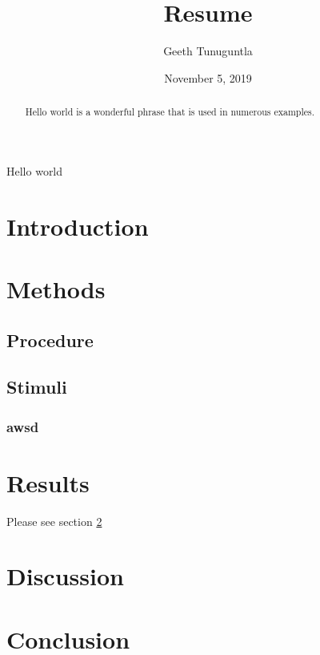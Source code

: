 \documentclass{article} %
\author{Geeth Tunuguntla}
\title{Resume}
\date{November 5, 2019}
\begin{document}
\maketitle %
\newpage%
\begin{abstract}
Hello world is a wonderful phrase that is used in numerous examples.
\end{abstract}

Hello world

\section{Introduction}

\section{Methods}\label{sec:method}%
\subsection{Procedure}
\subsection{Stimuli}
\subsubsection{awsd}

\section{Results}
Please see section \ref{sec:method}

\section{Discussion}
                                                                                                                                                                                                                                                                                                                                                                                                                                                                                                                                         
\section{Conclusion}
\end{document}
